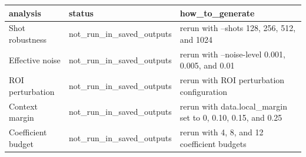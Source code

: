 \begin{tabular}{lll}
\toprule
analysis & status & how_to_generate \\
\midrule
Shot robustness & not_run_in_saved_outputs & rerun with --shots 128, 256, 512, and 1024 \\
Effective noise & not_run_in_saved_outputs & rerun with --noise-level 0.001, 0.005, and 0.01 \\
ROI perturbation & not_run_in_saved_outputs & rerun with ROI perturbation configuration \\
Context margin & not_run_in_saved_outputs & rerun with data.local_margin set to 0, 0.10, 0.15, and 0.25 \\
Coefficient budget & not_run_in_saved_outputs & rerun with 4, 8, and 12 coefficient budgets \\
\bottomrule
\end{tabular}
